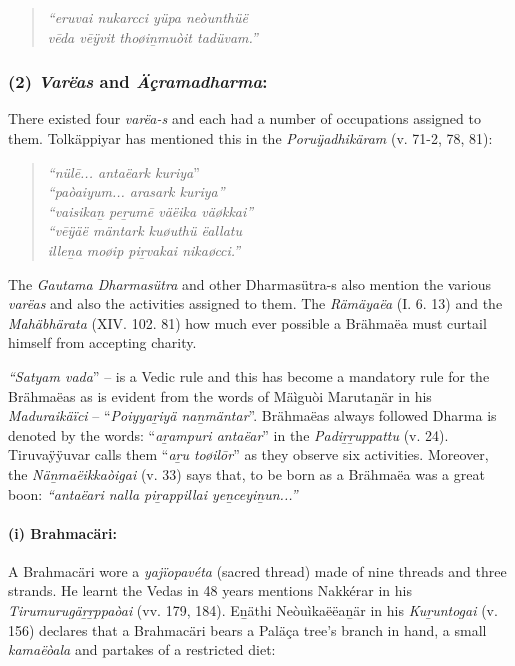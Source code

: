 \begin{verse}
\textit{“eruvai nukarcci yüpa neòunthüë}\\\textit{vēda vēÿvit thoøiṉmuòit tadüvam.”}
\end{verse}


\subsubsection*{(2) \textit{Varëas} and \textit{Äçramadharma}:}

There existed four \textit{varëa-s} and each had a number of occupations assigned to them. Tolkäppiyar has mentioned this in the \textit{Poruÿadhikäram} (v. 71-2, 78, 81):

\begin{verse}
\textit{“nülē... antaëark kuriya}”\\\textit{“paòaiyum... arasark kuriya”}\\\textit{“vaisikaṉ peṟumē väëika väøkkai”}\\\textit{“vēÿäë mäntark kuøuthü ëallatu\\ illeṉa moøip piṟvakai nikaøcci.”}
\end{verse}

The \textit{Gautama Dharmasütra} and other Dharmasütra-s also mention the various \textit{varëas} and also the activities assigned to them. The \textit{Rämäyaëa} (I. 6. 13) and the \textit{Mahäbhärata} (XIV. 102. 81) how much ever possible a Brähmaëa must curtail himself from accepting charity.

\textit{“Satyam vada}” – is a Vedic rule and this has become a mandatory rule for the Brähmaëas as is evident from the words of Mäìguòi Marutaṉär in his \textit{Maduraikäïci} – “\textit{Poiyyaṟiyä naṉmäntar}”. Brähmaëas always followed Dharma is denoted by the words: “\textit{aṟampuri antaëar}” in the \textit{Padiṟṟuppattu} (v. 24). Tiruvaÿÿuvar calls them “\textit{aṟu toøilōr}” as they observe six activities. Moreover, the \textit{Näṉmaëikkaòigai} (v. 33) says that, to be born as a Brähmaëa was a great boon: \textit{“antaëari nalla piṟappillai yeṉceyiṉun...”}

\paragraph*{(i) Brahmacäri:}

A Brahmacäri wore a \textit{yajïopavéta} (sacred thread) made of nine threads and three strands. He learnt the Vedas in 48 years mentions Nakkérar in his \textit{Tirumurugäṟṟppaòai} (vv. 179, 184). Eṉäthi Neòuìkaëëaṉär in his \textit{Kuṟuntogai} (v. 156) declares that a Brahmacäri bears a Paläça tree's branch in hand, a small \textit{kamaëòala} and partakes of a restricted diet:

